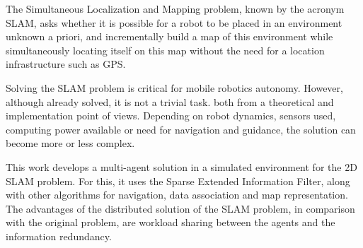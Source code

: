 The Simultaneous Localization and Mapping problem, known by the acronym SLAM, asks whether it is possible for a robot to be placed in an environment
unknown a priori, and incrementally build a map of this
environment while simultaneously locating itself on this map without the
need for a location infrastructure such as GPS.

Solving the SLAM problem is critical for mobile robotics
autonomy. However, although already solved, it is not a trivial task.
both from a theoretical and implementation point of views.
Depending on robot dynamics, sensors used, computing power available or need for navigation and guidance, the solution
can become more or less complex.

This work develops a multi-agent solution in a simulated environment
for the 2D SLAM problem. For this, it uses the Sparse Extended Information Filter, along with other algorithms for navigation,
data association and map representation. The advantages of the distributed solution of the
SLAM problem, in comparison with the original problem, are workload sharing
between the agents and the information redundancy.